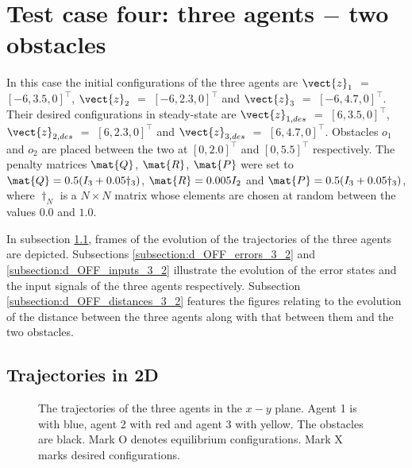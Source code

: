 \section{Test case four: three agents $-$ two obstacles}

In this case the initial configurations of the three agents are
$\vect{z}_1$ $=$ $[-6, 3.5, 0]^{\top}$,
$\vect{z}_2$ $=$ $[-6, 2.3, 0]^{\top}$ and
$\vect{z}_3$ $=$ $[-6, 4.7, 0]^{\top}$.
Their desired configurations in steady-state are
$\vect{z}_{1,des}$ $=$ $[6, 3.5, 0]^{\top}$,
$\vect{z}_{2,des}$ $=$ $[6, 2.3, 0]^{\top}$ and
$\vect{z}_{3,des}$ $=$ $[6, 4.7, 0]^{\top}$.
Obstacles $o_1$ and $o_2$ are placed between the two at $[0, 2.0]^{\top}$
and $[0, 5.5]^{\top}$ respectively. The penalty
matrices $\mat{Q}$, $\mat{R}$, $\mat{P}$ were set to
$\mat{Q} = 0.5 (I_3 + 0.05\dagger_3)$, $\mat{R} = 0.005 I_2$ and
$\mat{P} = 0.5 (I_3 + 0.05\dagger_3)$, where $\dagger_N$ is a $N \times N$
matrix whose elements are chosen at random between the values $0.0$ and $1.0$.

In subsection \ref{subsection:d_OFF_trajectories_3_2}, frames of the evolution of the
trajectories of the three agents are depicted. Subsections
\ref{subsection:d_OFF_errors_3_2} and \ref{subsection:d_OFF_inputs_3_2} illustrate
the evolution of the error states and the input signals of the three agents
respectively. Subsection \ref{subsection:d_OFF_distances_3_2} features the
figures relating to the evolution of the distance between the three agents
along with that between them and the two obstacles.


\subsection{Trajectories in 2D}
\label{subsection:d_OFF_trajectories_3_2}

\begin{figure}[H]
  
  \caption{The trajectories of the three agents in the $x-y$ plane. Agent 1 is with
    blue, agent 2 with red and agent 3 with yellow. The obstacles are black.
    Mark O denotes equilibrium configurations. Mark X marks desired configurations.}
  \label{fig:d_OFF_trajectory_3_2}
\end{figure}



